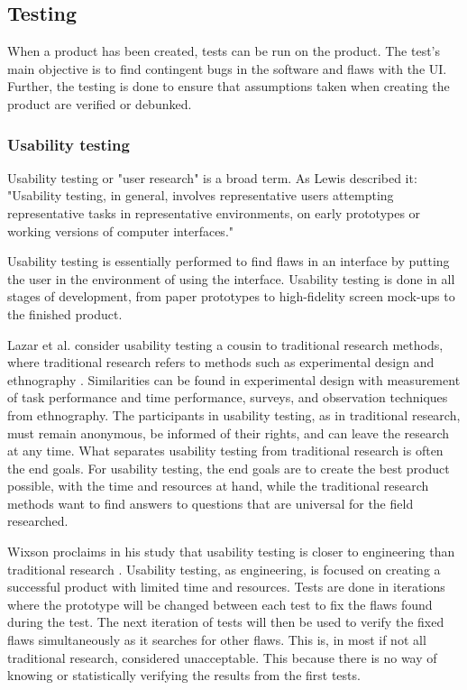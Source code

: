 \subsection{Testing}%
\label{sub:Testing}
When a product has been created, tests can be run on the product. The test's main objective is to find contingent bugs in the software and flaws with the UI. Further, the testing is done to ensure that assumptions taken when creating the product are verified or debunked.

\subsubsection{Usability testing}%
\label{ssub:User testing}
Usability testing or "user research" is a broad term. As Lewis  described it: "Usability testing, in general, involves representative users attempting representative tasks in representative environments, on early prototypes or working versions of computer interfaces." \cite{lewis2006usability} 

Usability testing is essentially performed to find flaws in an interface by putting the user in the environment of using the interface. Usability testing is done in all stages of development, from paper prototypes to high-fidelity screen mock-ups to the finished product. 

Lazar et al. \cite[Chapter~10]{lazar2017research}  consider usability testing a cousin to traditional research methods, where traditional research refers to methods such as experimental design \cite[Chapter~3]{lazar2017research}  and ethnography \cite[Chapter~9]{lazar2017research}.
Similarities can be found in experimental design with measurement of task performance and time performance, surveys, and observation techniques from ethnography. The participants in usability testing, as in traditional research, must remain anonymous, be informed of their rights, and can leave the research at any time. What separates usability testing from traditional research is often the end goals. For usability testing, the end goals are to create the best product possible, with the time and resources at hand, while the traditional research methods want to find answers to questions that are universal for the field researched. 
	
Wixson proclaims in his study that usability testing is closer to engineering than traditional research \cite{wixon2003evaluating}. Usability testing, as engineering, is focused on creating a successful product with limited time and resources. Tests are done in iterations where the prototype will be changed between each test to fix the flaws found during the test. The next iteration of tests will then be used to verify the fixed flaws simultaneously as it searches for other flaws. This is, in most if not all traditional research, considered unacceptable. This because there is no way of knowing or statistically verifying the results from the first tests. 


